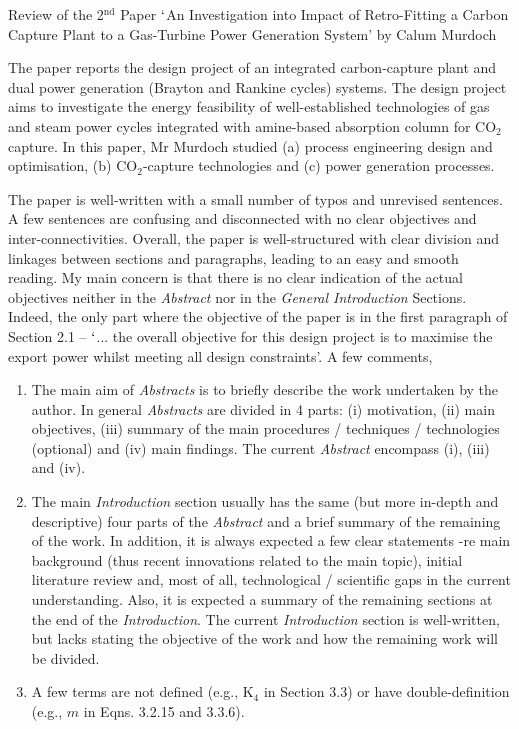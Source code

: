 \documentclass[14pt,twoside]{report}
\begin{document}

\bigskip

\begin{center}
  {\Large Review of the 2$^{\text{nd}}$ Paper $\lq$An Investigation into Impact of Retro-Fitting a Carbon Capture Plant to a Gas-Turbine Power Generation System' by Calum Murdoch}
\end{center}

The paper reports the design project of an integrated carbon-capture plant and dual power generation (Brayton and Rankine cycles) systems. The design project aims to investigate the energy feasibility of well-established technologies of gas and steam power cycles integrated with amine-based absorption column for CO$_{2}$ capture.  In this paper, Mr Murdoch studied (a) process engineering design and optimisation, (b) CO$_{2}$-capture technologies and (c) power generation processes.

The paper is well-written with a small number of typos and unrevised sentences. A few sentences are confusing and disconnected with no clear objectives and inter-connectivities. Overall, the paper is well-structured with clear division and linkages between sections and paragraphs, leading to an easy and smooth reading. My main concern is that there is no clear indication of the actual objectives neither in the {\it Abstract} nor in the {\it General Introduction} Sections. Indeed, the only part where the objective of the paper is in the first paragraph of Section 2.1 -- $\lq$... the overall objective for this design project is to maximise the export power whilst meeting all design constraints'.  A few comments,

\begin{enumerate}
%
\item The main aim of {\it Abstracts} is to briefly describe the work undertaken by the author. In general {\it Abstracts} are divided in 4 parts: (i) motivation, (ii) main objectives, (iii) summary of the main procedures / techniques / technologies (optional) and (iv) main findings. The current {\it Abstract} encompass (i), (iii) and (iv).
%
\item The main {\it Introduction} section usually has the same (but more in-depth and descriptive) four parts of the {\it Abstract} and a brief summary of the remaining of the work. In addition, it is always expected a few clear statements -re main background (thus recent innovations related to the main topic), initial literature review and, most of all, technological / scientific gaps in the current understanding. Also, it is expected a summary of the remaining sections at the end of the {\it Introduction}. The current {\it Introduction} section is well-written, but lacks stating the objective of the work and how the remaining work will be divided. 
%
\item A few terms are not defined (e.g., K$_{4}$ in Section 3.3) or have double-definition (e.g., $m$ in Eqns. 3.2.15 and 3.3.6).
% 
\end{enumerate}
\end{document}
